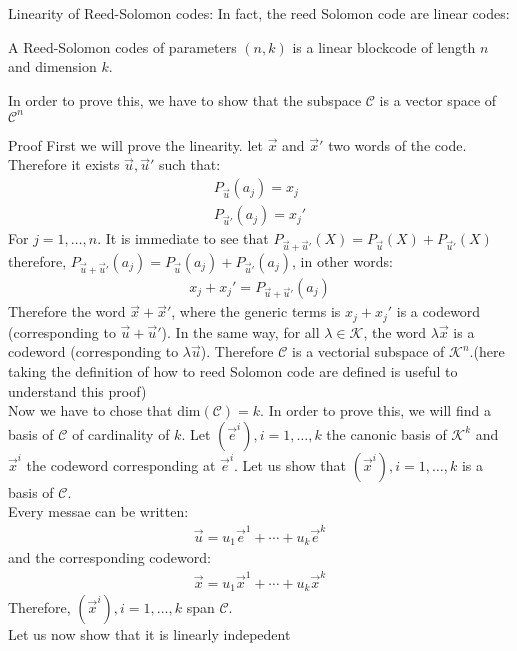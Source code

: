 \begin{parag}{Linearity of Reed-Solomon codes:}
    In fact, the reed Solomon code are linear codes:
    \begin{theoreme}
        A Reed-Solomon codes of parameters $\left(n, k\right)$ is a linear blockcode of length $n$ and dimension $k$.
    \end{theoreme}
    
    \begin{framedremark}
    In order to prove this, we have to show that the subspace $\mathcal{C}$ is a vector space of $\mathcal{C}^n$
    \end{framedremark}
    \begin{subparag}{Proof}
        First we will prove the linearity. let $\vec{x}$ and $\vec{x}'$ two words of the code. Therefore it exists $\vec{u}, \vec{u}'$ such that:
        \begin{align*} 
            P_{\vec{u}}\left(a_j\right) =  x_j\\
            P_{\vec{u}'}\left(a_j\right) =  x_j'
        \end{align*}
        For $j = 1, \ldots, n$. It is immediate to see that $P_{\vec{u} + \vec{u}'}\left(X\right) = P_{\vec{u}}\left(X\right) + P_{\vec{u}'}\left(X\right)$ therefore, $P_{\vec{u} + \vec{u}'}\left(a_j\right) = P_{\vec{u}}\left(a_j\right) + P_{\vec{u}'}\left(a_j\right)$, in other words:
        \begin{align*} 
            x_j + x_j' =  P_{\vec{u} + \vec{u}'}\left(a_j\right)
        \end{align*}
        Therefore the word $\vec{x} + \vec{x}'$, where the generic terms is $x_j + x_j'$ is a codeword (corresponding to $\vec{u} + \vec{u}'$). In the same way, for all $\lambda \in \mathcal{K}$, the word $\lambda\vec{x}$ is a codeword (corresponding to $\lambda\vec{u}$). Therefore $\mathcal{C}$ is a vectorial subspace of $\mathcal{K}^n$.(here taking the definition of how to reed Solomon code are defined is useful to understand this proof)\\
        Now we have to chose that dim$\left(\mathcal{C}\right) = k$. In order to prove this, we will find a basis of $\mathcal{C}$ of cardinality of $k$. Let $\left(\vec{e}^i\right), i = 1, \ldots, k$ the canonic basis of $\mathcal{K}^k$ and $\vec{x}^i$ the codeword corresponding at $\vec{e}^i$. Let us show that $\left(\vec{x}^i\right), i =1, \ldots, k$ is a basis of $\mathcal{C}$.\\
        Every messae can be written:
        \begin{align*} 
            \vec{u} =  u_1\vec{e}^1 + \cdots + u_k\vec{e}^k
        \end{align*}
        and the corresponding codeword:
        \begin{align*} 
            \vec{x} = u_1\vec{x}^1 + \cdots + u_k\vec{x}^k
        \end{align*}
        Therefore, $\left(\vec{x}^i\right), i = 1, \ldots, k$ span $\mathcal{C}$.\\
        Let us now show that it is linearly indepedent
    \end{subparag}
\end{parag}

